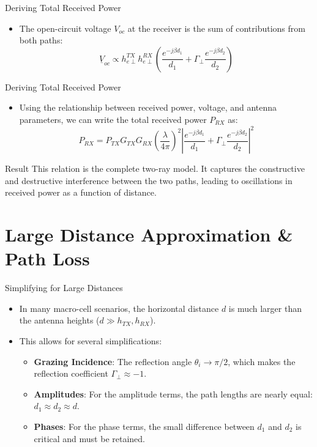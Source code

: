 \documentclass{beamer}
\begin{document}
	\begin{frame}{Deriving Total Received Power}
		\begin{itemize}
			\item The open-circuit voltage $V_{oc}$ at the receiver is the sum of contributions from both paths:
			\[ \underline{V}_{oc} \propto h_{e\perp}^{TX} h_{e\perp}^{RX} \left( \frac{e^{-j\beta d_1}}{d_1} + \Gamma_{\perp} \frac{e^{-j\beta d_2}}{d_2} \right) \]
			
		\end{itemize}
		
	\end{frame}
	
	\begin{frame}{Deriving Total Received Power}
		\begin{itemize}
			
			\item Using the relationship between received power, voltage, and antenna parameters, we can write the total received power $P_{RX}$ as:
			\[ P_{RX} = P_{TX} G_{TX} G_{RX} \left( \frac{\lambda}{4\pi} \right)^2 \left| \frac{e^{-j\beta d_1}}{d_1} + \Gamma_{\perp} \frac{e^{-j\beta d_2}}{d_2} \right|^2 \]
		\end{itemize}
		\begin{alertblock}{Result}
			This relation is the complete two-ray model. It captures the constructive and destructive interference between the two paths, leading to oscillations in received power as a function of distance.
		\end{alertblock}
	\end{frame}
	
	\section{Large Distance Approximation \& Path Loss}
	
	\begin{frame}{Simplifying for Large Distances}
		\begin{itemize}
			\item In many macro-cell scenarios, the horizontal distance $d$ is much larger than the antenna heights ($d \gg h_{TX}, h_{RX}$).
			\item This allows for several simplifications:
			\begin{itemize}
				\item \textbf{Grazing Incidence}: The reflection angle $\theta_i \to \pi/2$, which makes the reflection coefficient $\Gamma_{\perp} \approx -1$.
				\item \textbf{Amplitudes}: For the amplitude terms, the path lengths are nearly equal: $d_1 \approx d_2 \approx d$.
				\item \textbf{Phases}: For the phase terms, the small difference between $d_1$ and $d_2$ is critical and must be retained.
			\end{itemize}
		\end{itemize}
	\end{frame}
	
\end{document}
